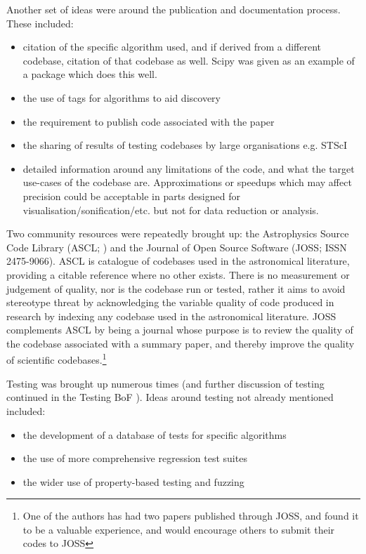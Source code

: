 \documentclass[11pt,twoside]{article}
\begin{document}
Another set of ideas were around the publication and documentation process.
These included:
\begin{itemize}
  \item citation of the specific algorithm used, and if derived from a different
    codebase, citation of that codebase as well. Scipy
    \citep{2020NatMe..17..261V} was given as an example of a package which does
    this well.
  \item the use of tags for algorithms to aid discovery
  \item the requirement to publish code associated with the paper
  \item the sharing of results of testing codebases by large organisations e.g.
    STScI
  \item detailed information around any limitations of the code, and what the
    target use-cases of the codebase are.  Approximations or speedups which may
    affect precision could be acceptable in parts designed for
    visualisation/sonification/etc. but not for data reduction or analysis.
\end{itemize}

Two community resources were repeatedly brought up: the Astrophysics Source Code
Library (ASCL; \citet{2020ASPC..522..731A}) and the Journal of Open Source
Software (JOSS; ISSN 2475-9066). ASCL is catalogue of codebases used in the
astronomical literature, providing a citable reference where no other exists.
There is no measurement or judgement of quality, nor is the codebase run or
tested, rather it aims to avoid stereotype threat by acknowledging the variable
quality of code produced in research by indexing any codebase used in the
astronomical literature. JOSS complements ASCL by being a journal whose purpose
is to review the quality of the codebase associated with a summary paper, and
thereby improve the quality of scientific codebases.\footnote{One of the authors
  has had two papers published through JOSS, and found it to be a valuable
  experience, and would encourage others to submit their codes to JOSS}

Testing was brought up numerous times (and further discussion of testing
continued in the Testing BoF \citep{B___adassxxxii}). Ideas around testing not already
mentioned included:
\begin{itemize}
  \item the development of a database of tests for specific algorithms
  \item the use of more comprehensive regression test suites
  \item the wider use of property-based testing and fuzzing
\end{itemize}
\end{document}
